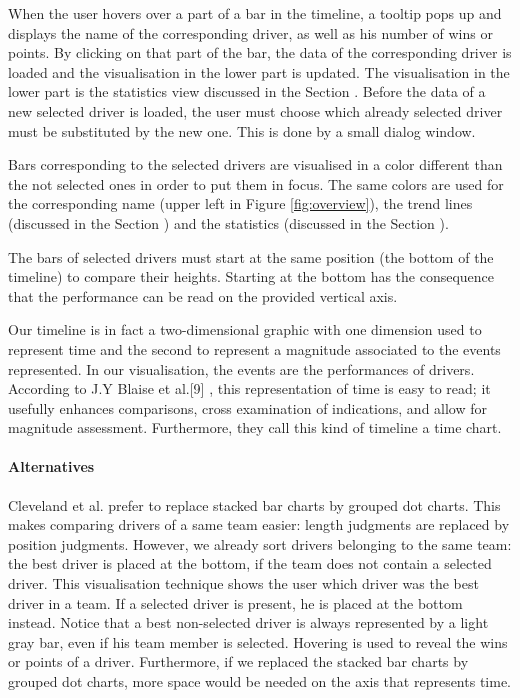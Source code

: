 \documentclass{sigchi}
\begin{document}
When the user hovers over a part of a bar in the timeline, a tooltip pops up and displays the name of the corresponding driver, as well as his number of wins or points.  By clicking on that part of the bar, the data of the corresponding driver is loaded and the visualisation in the lower part is updated. The visualisation in the lower part is the statistics view discussed in the Section . Before the data of a new selected driver is loaded, the user must choose which already selected driver must be substituted by the new one. This is done by a small dialog window.

Bars corresponding to the selected drivers are visualised in a color different than the not selected ones in order to put them in focus. The same colors are used for the corresponding name (upper left in Figure \ref{fig:overview}), the trend lines (discussed in the Section ) and the statistics (discussed in the Section ).

The bars of selected drivers must start at the same position (the bottom of the timeline) to compare their heights. Starting at the bottom has the consequence that the performance can be read on the provided vertical axis.

Our timeline is in fact a two-dimensional graphic with one dimension used to represent time and the second to represent a magnitude associated to the events represented. In our visualisation, the events are the performances of drivers. According to J.Y Blaise et al.[9] , this representation of time is easy to read; it usefully enhances comparisons, cross examination of indications, and allow for magnitude assessment.  Furthermore, they call this kind of timeline a time chart. 


\paragraph{Alternatives}

Cleveland et al.\cite{cleveland1984graphical} prefer to replace stacked bar charts by grouped dot charts. This makes comparing drivers of a same team easier: length judgments are replaced by position judgments. However, we already sort drivers belonging to the same team: the best driver is placed at the bottom, if the team does not contain a selected driver. This visualisation technique shows the user which driver was the best driver in a team. If a selected driver is present, he is placed at the bottom instead. Notice that a best non-selected driver is always represented by a light gray bar, even if his team member is selected. Hovering is used to reveal the wins or points of a driver. Furthermore, if we replaced the stacked bar charts by grouped dot charts, more space would be  needed on the axis that represents time.
\end{document}

